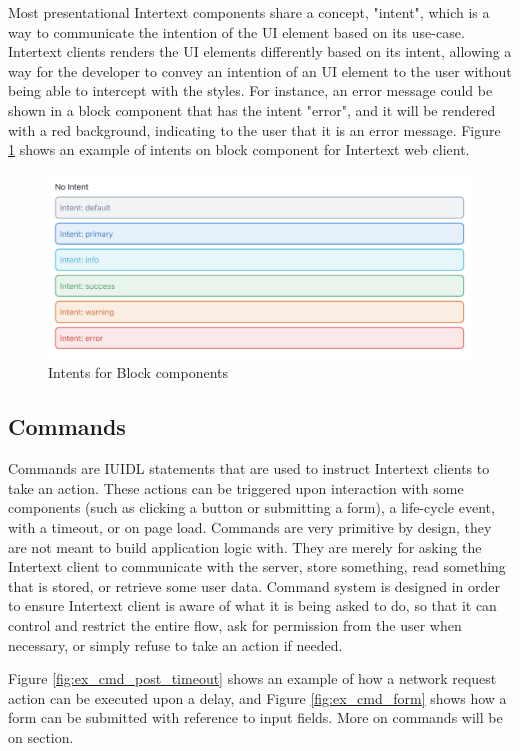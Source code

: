 Most presentational Intertext components share a concept, "intent", which is a way to communicate the intention of the UI element based on its use-case. Intertext clients renders the UI elements differently based on its intent, allowing a way for the developer to convey an intention of an UI element to the user without being able to intercept with the styles. For instance, an error message could be shown in a block component that has the intent "error", and it will be rendered with a red background, indicating to the user that it is an error message. Figure \ref{fig:intents} shows an example of intents on block component for Intertext web client.

\begin{figure}
  \centering
  \includegraphics[width=13cm]{thesis/paper/images/intents.png}
  \caption{Intents for Block components}%
  \label{fig:intents}%
\end{figure}

\subsection{Commands}

Commands are IUIDL statements that are used to instruct Intertext clients to take an action. These actions can be triggered upon interaction with some components (such as clicking a button or submitting a form), a life-cycle event, with a timeout, or on page load. Commands are very primitive by design, they are not meant to build application logic with. They are merely for asking the Intertext client to communicate with the server, store something, read something that is stored, or retrieve some user data. Command system is designed in order to ensure Intertext client is aware of what it is being asked to do, so that it can control and restrict the entire flow, ask for permission from the user when necessary, or simply refuse to take an action if needed. 

Figure \ref{fig:ex_cmd_post_timeout} shows an example of how a network request action can be executed upon a delay, and Figure \ref{fig:ex_cmd_form} shows how a form can be submitted with reference to input fields. More on commands will be on  section.

